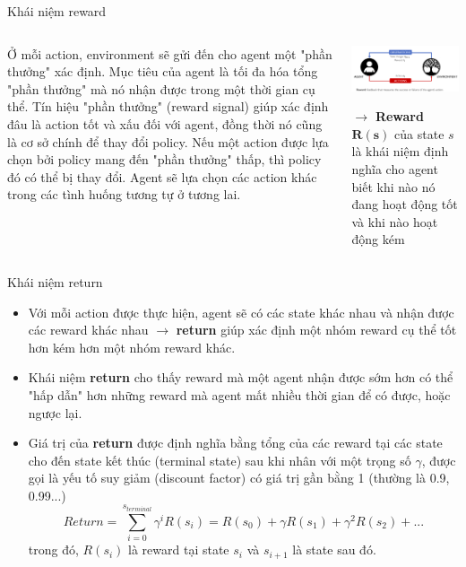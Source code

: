 \documentclass[10pt,aspectratio=169]{beamer}
\begin{document}
\begin{frame}{Khái niệm reward}{\subsecname}
\begin{columns}
\begin{column}{0.4\textwidth}
Ở mỗi action, environment sẽ gửi đến cho agent một "phần thưởng" xác định. Mục tiêu của agent là tối đa hóa tổng "phần thưởng" mà nó nhận được trong một thời gian cụ thể. Tín hiệu "phần thưởng" (reward signal) giúp xác định đâu là action tốt và xấu đối với agent, đồng thời nó cũng là cơ sở chính để thay đổi policy. Nếu một action được lựa chọn bởi policy mang đến "phần thưởng" thấp, thì policy đó có thể bị thay đổi. Agent sẽ lựa chọn các action khác trong các tình huống tương tự ở tương lai.\\
\end{column}
\begin{column}{0.5\textwidth}
\hypertarget{loop}{\includegraphics[width=\textwidth]{source/5.png}\\}
\vspace{20pt}
$ \longrightarrow $ \textbf{Reward $ \boldsymbol{R(s)} $} của state $ s $ là khái niệm định nghĩa cho agent biết khi nào nó đang hoạt động tốt và khi nào hoạt động kém\\
\end{column}
\end{columns}
\end{frame}

\begin{frame}{Khái niệm return}{\subsecname}
\begin{itemize}
\setlength\itemsep{8pt}
\item Với mỗi action được thực hiện, agent sẽ có các state khác nhau và nhận được các reward khác nhau $ \rightarrow $ \textbf{return} giúp xác định một nhóm reward cụ thể tốt hơn kém hơn một nhóm reward khác.
\item Khái niệm \textbf{return} cho thấy reward mà một agent nhận được sớm hơn có thể "hấp dẫn" hơn những reward mà agent mất nhiều thời gian để có được, hoặc ngược lại.
\item Giá trị của \textbf{return} được định nghĩa bằng tổng của các reward tại các state cho đến state kết thúc (terminal state) sau khi nhân với một trọng số $ \gamma $, được gọi là yếu tố suy giảm (discount factor) có giá trị gần bằng 1 (thường là 0.9, 0.99...)
\begin{equation*}
Return = \sum_{i=0}^{s_{terminal}} \gamma^i R(s_i) = R(s_0) + \gamma R(s_1) + \gamma^2 R(s_2) + ...
\end{equation*}
trong đó, $ R(s_i) $ là reward tại state $ s_i $ và $ s_{i+1} $ là state sau đó.
\end{itemize}
\end{frame}
\end{document}
